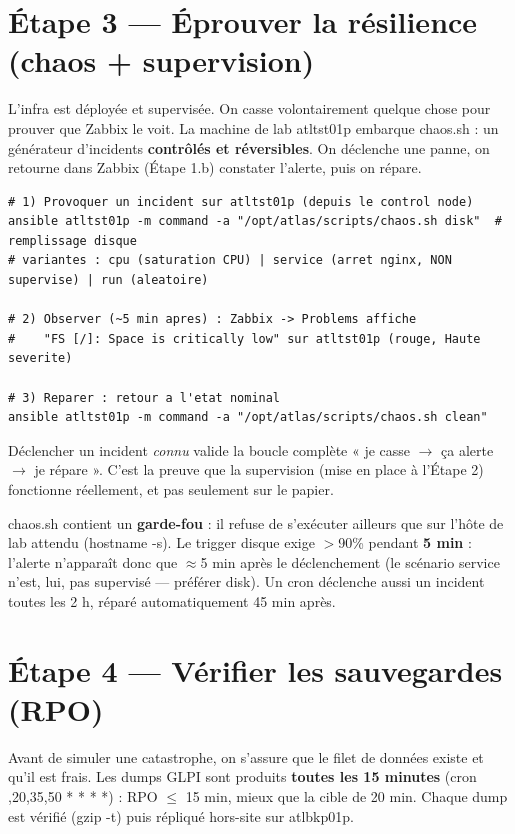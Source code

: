 \documentclass[11pt,a4paper]{article}
\newcommand{\cmd}[1]{{\ttfamily #1}}
\begin{document}
\section{Étape 3 — Éprouver la résilience (chaos + supervision)}
\begin{etape}{L'infra est déployée et supervisée. On casse volontairement quelque chose
pour prouver que Zabbix le voit.}
La machine de lab \cmd{atltst01p} embarque \cmd{chaos.sh} : un générateur d'incidents
\textbf{contrôlés et réversibles}. On déclenche une panne, on retourne dans Zabbix
(Étape 1.b) constater l'alerte, puis on répare.
\end{etape}

\begin{lstlisting}[style=bash]
# 1) Provoquer un incident sur atltst01p (depuis le control node)
ansible atltst01p -m command -a "/opt/atlas/scripts/chaos.sh disk"  # remplissage disque
# variantes : cpu (saturation CPU) | service (arret nginx, NON supervise) | run (aleatoire)

# 2) Observer (~5 min apres) : Zabbix -> Problems affiche
#    "FS [/]: Space is critically low" sur atltst01p (rouge, Haute severite)

# 3) Reparer : retour a l'etat nominal
ansible atltst01p -m command -a "/opt/atlas/scripts/chaos.sh clean"
\end{lstlisting}

\begin{pourquoi}
Déclencher un incident \emph{connu} valide la boucle complète « je casse $\rightarrow$ ça
alerte $\rightarrow$ je répare ». C'est la preuve que la supervision (mise en place à
l'Étape 2) fonctionne réellement, et pas seulement sur le papier.
\end{pourquoi}

\begin{attention}
\cmd{chaos.sh} contient un \textbf{garde-fou} : il refuse de s'exécuter ailleurs que sur
l'hôte de lab attendu (\cmd{hostname -s}). Le trigger disque exige $>$90\% pendant
\textbf{5 min} : l'alerte n'apparaît donc que $\approx$5 min après le déclenchement (le
scénario \cmd{service} n'est, lui, pas supervisé — préférer \cmd{disk}). Un cron déclenche
aussi un incident toutes les 2 h, réparé automatiquement 45 min après.
\end{attention}

\section{Étape 4 — Vérifier les sauvegardes (RPO)}
\begin{etape}{Avant de simuler une catastrophe, on s'assure que le filet de données existe
et qu'il est frais.}
Les dumps GLPI sont produits \textbf{toutes les 15 minutes} (cron \cmd{5,20,35,50 * * * *}) :
RPO $\leq$ 15 min, mieux que la cible de 20 min. Chaque dump est vérifié (\cmd{gzip -t})
puis répliqué hors-site sur \cmd{atlbkp01p}.
\end{etape}
\end{document}
